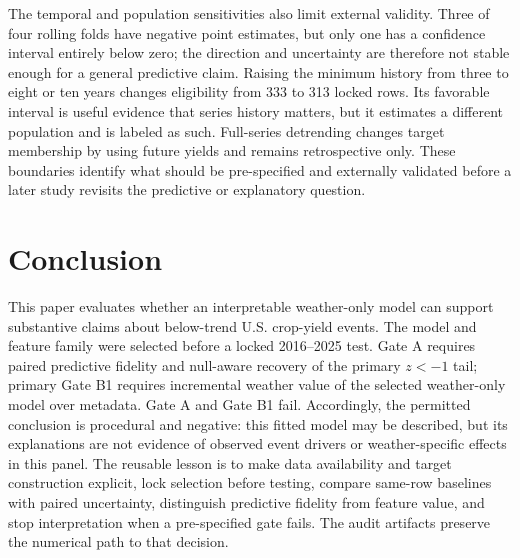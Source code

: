 \documentclass[conference]{IEEEtran}
\begin{document}
The temporal and population sensitivities also limit external validity. Three of
four rolling folds have negative point estimates, but only one has a confidence
interval entirely below zero; the direction and uncertainty are therefore not stable
enough for a general predictive claim. Raising the minimum history from three to
eight or ten years changes eligibility from 333 to 313 locked rows. Its favorable
interval is useful evidence that series history matters, but it estimates a different
population and is labeled as such. Full-series detrending changes target membership
by using future yields and remains retrospective only. These boundaries identify
what should be pre-specified and externally validated before a later study revisits
the predictive or explanatory question.

\section{Conclusion}
This paper evaluates whether an interpretable weather-only model can support
substantive claims about below-trend U.S. crop-yield events. The model and feature
family were selected before a locked 2016--2025 test. Gate A requires paired
predictive fidelity and null-aware recovery of the primary $z<-1$ tail; primary
Gate B1 requires incremental weather value of the selected weather-only model over
metadata. Gate A and Gate B1 fail. Accordingly,
the permitted conclusion is procedural and negative: this fitted model may be
described, but its explanations are not evidence of observed event drivers or
weather-specific effects in this panel. The reusable lesson is to make data
availability and target construction explicit, lock selection before testing,
compare same-row baselines with paired uncertainty, distinguish predictive
fidelity from feature value, and stop interpretation when a pre-specified gate
fails. The audit artifacts preserve the numerical path to that decision.



\end{document}
